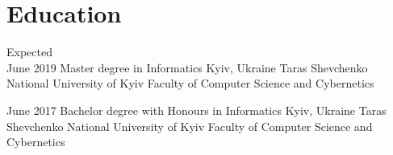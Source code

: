 \documentclass[letterpaper]{twentysecondcv} %
\begin{document}
\makeprofile %

\section{Education}

\begin{twenty} %
	\twentyitem
    	{Expected \\ June 2019}
        {Master degree in Informatics}
        {Kyiv, Ukraine}
        {Taras Shevchenko National University of Kyiv}
        {Faculty of Computer Science and Cybernetics}
        
	\twentyitem
    	{June 2017}
        {Bachelor degree with Honours in Informatics}
        {Kyiv, Ukraine}
        {Taras Shevchenko National University of Kyiv}
        {Faculty of Computer Science and Cybernetics}
        
\end{twenty}



\end{document}
